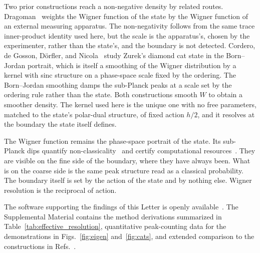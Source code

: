 \documentclass[%
  aps, reprint, pra, amsmath,amssymb
]{revtex4-2}
\begin{document}
Two prior constructions reach a non-negative density by related routes. Dragoman~\cite{dragoman2005} weights the Wigner function of the state by the Wigner function of an external measuring apparatus. The non-negativity follows from the same trace inner-product identity used here, but the scale is the apparatus's, chosen by the experimenter, rather than the state's, and the boundary is not detected. Cordero, de Gosson, D\"orfler, and Nicola~\cite{cordero2018} study Zurek's diamond cat state in the Born--Jordan portrait, which is itself a smoothing of the Wigner distribution by a kernel with sinc structure on a phase-space scale fixed by the ordering. The Born--Jordan smoothing damps the sub-Planck peaks at a scale set by the ordering rule rather than the state. Both constructions smooth $W$ to obtain a smoother density. The kernel used here is the unique one with no free parameters, matched to the state's polar-dual structure, of fixed action $h/2$, and it resolves at the boundary the state itself defines.

The Wigner function remains the phase-space portrait of the state. Its sub-Planck dips quantify non-classicality~\cite{kenfack2004} and certify computational resources~\cite{marieisert2012,veitch2012}. They are visible on the fine side of the boundary, where they have always been. What is on the coarse side is the same peak structure read as a classical probability. The boundary itself is set by the action of the state and by nothing else. Wigner resolution is the reciprocal of action.

The software supporting the findings of this Letter is openly available~\cite{osfdeposit}. The Supplemental Material contains the method derivations summarized in Table~\ref{tab:effective_resolution}, quantitative peak-counting data for the demonstrations in Figs.~\ref{fig:eigen} and~\ref{fig:cats}, and extended comparison to the constructions in Refs.~\cite{dragoman2005,cordero2018}.


\end{document}
